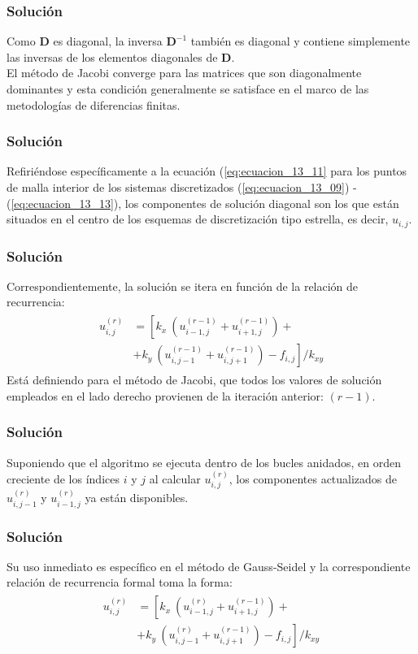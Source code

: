 \documentclass[12pt]{beamer}
\begin{document}
\begin{frame}
\frametitle{Solución}
Como $\mathbf{D}$ es diagonal, la inversa $\mathbf{D}^{-1}$ también es diagonal y contiene simplemente las inversas de los elementos diagonales de $\mathbf{D}$.
\\
\bigskip
El método de Jacobi converge para las matrices que son diagonalmente dominantes y esta condición generalmente se satisface en el marco de las metodologías de diferencias finitas.
\end{frame}
\begin{frame}
\frametitle{Solución}
Refiriéndose específicamente a la ecuación (\ref{eq:ecuacion_13_11} para los puntos de malla interior de los sistemas discretizados (\ref{eq:ecuacion_13_09}) - (\ref{eq:ecuacion_13_13}), los componentes de solución diagonal son los que están situados en el centro de los esquemas de discretización tipo estrella, es decir, $u_{i,j}$.
\end{frame}
\begin{frame}
\frametitle{Solución}
Correspondientemente, la solución se itera en función de la relación de recurrencia:
\begin{align}
\begin{aligned}
u_{i,j}^{(r)} &= \left[ k_{x} \: \left( u_{i-1,j}^{(r-1)} + u_{i+1, j}^{(r-1)} \right) + \right. \\
&+ \left. k_{y} \: \left( u_{i,j-1}^{(r-1)} + u_{i, j+1}^{(r-1)} \right) - f_{i,j} \right] / k_{xy}
\end{aligned}
\label{eq:ecuacion_13_22} 	
\end{align}
\pause
Está definiendo para el método de Jacobi, que todos los valores de solución empleados en el lado derecho provienen de la iteración anterior: $(r - 1)$.
\end{frame}
\begin{frame}
\frametitle{Solución}
Suponiendo que el algoritmo se ejecuta dentro de los bucles anidados, en orden creciente de los índices $i$ y $j$ al calcular $u_{i,j}^{(r)}$, los componentes actualizados de $u_{i, j-1}^{(r)}$ y $u_{i-1, j}^{(r)}$ ya están disponibles.
\end{frame}
\begin{frame}
\frametitle{Solución}
Su uso inmediato es específico en el método de Gauss-Seidel y la correspondiente relación de recurrencia formal toma la forma:
\begin{align}
\begin{aligned}
u_{i,j}^{(r)} &= \left[ k_{x} \: \left( u_{i-1,j}^{(r)} + u_{i+1, j}^{(r-1)} \right) + \right. \\
&+ \left. k_{y} \: \left( u_{i,j-1}^{(r)} + u_{i, j+1}^{(r-1)} \right) - f_{i,j} \right] / k_{xy}
\end{aligned}
\label{eq:ecuacion_13_23} 	
\end{align}
\end{frame}
\end{document}

